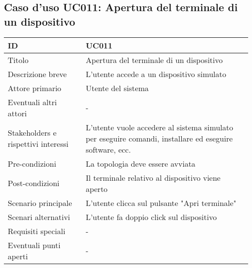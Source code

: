 \documentclass[../../main.tex]{subfiles}
\begin{document}
\subsection{Caso d’uso UC011: Apertura del terminale di un dispositivo }
\begin{tabularx}{150mm}{|l|X|}
    \hline
    ID                                  & \textbf{UC011}\\
    \hline
    Titolo                              & Apertura del terminale di un dispositivo \\
    \hline
    Descrizione breve                   & L'utente accede a un dispositivo simulato \\ 
    \hline
    Attore primario                     & Utente del sistema   \\
    \hline
    Eventuali altri attori              & -   \\
    \hline
    Stakeholders e rispettivi interessi & L'utente vuole accedere al sistema simulato per eseguire comandi, installare ed eseguire software, ecc.   \\
    \hline
    Pre-condizioni                      & La topologia deve essere avviata   \\
    \hline
    Post-condizioni                     & Il terminale relativo al dispositivo viene aperto   \\
    \hline
    Scenario principale                 & L'utente clicca sul pulsante "Apri terminale"   \\
    \hline
    Scenari alternativi                 & L'utente fa doppio click sul dispositivo   \\
    \hline
    Requisiti speciali                  & -   \\
    \hline
    Eventuali punti aperti              & -   \\
    \hline
\end{tabularx}
\vfill\newpage
\end{document}
